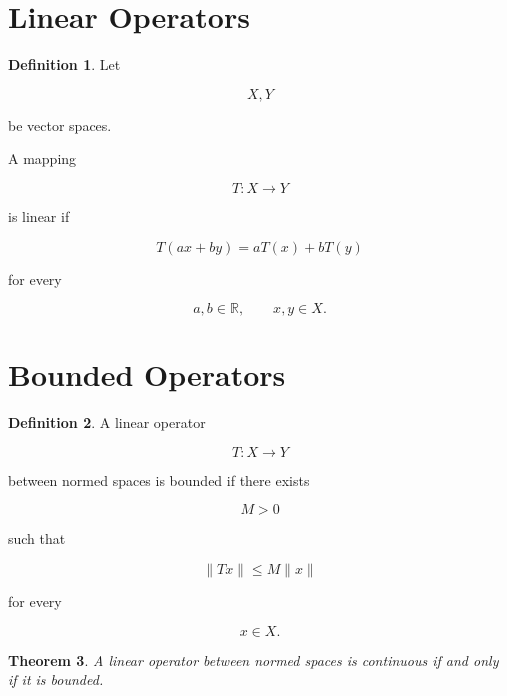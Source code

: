 \documentclass[11pt]{book}
\numberwithin{equation}{chapter}
\theoremstyle{definition}
\newtheorem{definition}{Definition}[chapter]
\theoremstyle{plain}
\newtheorem{theorem}[definition]{Theorem}
\begin{document}

\section{Linear Operators}

\begin{definition}

Let

\[
X,Y
\]

be vector spaces.

A mapping

\[
T:X\rightarrow Y
\]

is linear if

\[
T(ax+by)
=
aT(x)+bT(y)
\]

for every

\[
a,b\in\mathbb R,
\qquad
x,y\in X.
\]

\end{definition}


\section{Bounded Operators}

\begin{definition}

A linear operator

\[
T:X\rightarrow Y
\]

between normed spaces is bounded if there exists

\[
M>0
\]

such that

\[
\|Tx\|
\le
M\|x\|
\]

for every

\[
x\in X.
\]

\end{definition}


\begin{theorem}

A linear operator between normed spaces is continuous if and only if it
is bounded.

\end{theorem}

\end{document}
